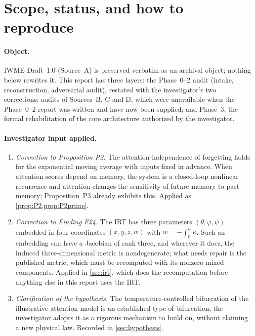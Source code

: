 \documentclass[11pt]{article}
\theoremstyle{definition}
\theoremstyle{remark}
\begin{document}
\clearpage
\tableofcontents

\section{Scope, status, and how to reproduce}

\paragraph{Object.} IWME Draft~1.0 (Source~A) is preserved verbatim as an archival object; nothing below rewrites it. This report has three layers: the Phase~0--2 audit (intake, reconstruction, adversarial audit), restated with the investigator's two corrections; audits of Sources~B, C and D, which were unavailable when the Phase~0--2 report was written and have now been supplied; and Phase~3, the formal rehabilitation of the core architecture authorized by the investigator.

\paragraph{Investigator input applied.}
\begin{enumerate}[label=(\alph*)]
\item \emph{Correction to Proposition P2.} The attention-independence of forgetting holds for the exponential moving average with inputs fixed in advance. When attention scores depend on memory, the system is a closed-loop nonlinear recurrence and attention changes the sensitivity of future memory to past memory; Proposition~P3 already exhibits this. Applied as \cref{prop:P2,prop:P2prime}.
\item \emph{Correction to Finding F24.} The IRT has three parameters $(\theta,\varphi,\psi)$ embedded in four coordinates $(x,y,z,w)$ with $w=-\int_0^\psi\kappa$. Such an embedding can have a Jacobian of rank three, and wherever it does, the induced three-dimensional metric is nondegenerate; what needs repair is the published metric, which must be recomputed with its nonzero mixed components. Applied in \cref{sec:irt}, which does the recomputation before anything else in this report uses the IRT.
\item \emph{Clarification of the hypothesis.} The temperature-controlled bifurcation of the illustrative attention model is an established type of bifurcation; the investigator adopts it as a rigorous mechanism to build on, without claiming a new physical law. Recorded in \cref{sec:hypothesis}.
\end{enumerate}
\end{document}

